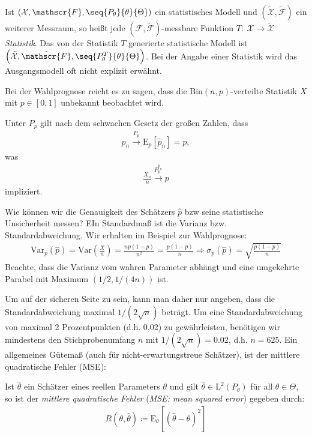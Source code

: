 \documentclass[a4paper]{scrartcl}
\begin{document}
		\begin{definition}
			Ist $(\mathcal{X},\mathscr{F},\seq{P_\theta}{\theta}{\Theta})$ ein statistisches Modell und $(\tilde{\mathcal{X}},\tilde{\mathscr{F}})$ ein weiterer Messraum, so heißt jede $(\mathscr{F},\tilde{\mathscr{F}})$-messbare Funktion $T\colon~\mathcal{X}\to\tilde{\mathcal{X}}$ \emph{Statistik}. Das von der Statistik $T$ generierte statistische Modell ist $\left(\tilde{\mathcal{X}},\tilde{\mathscr{F}},\seq{P_\theta^T}{\theta}{\Theta}\right)$. Bei der Angabe einer Statistik wird das Ausgangsmodell oft nicht explizit erwähnt.
		\end{definition}
		\begin{example}
			Bei der Wahlprognose reicht es zu sagen, dass die Bin$(n,p)$-verteilte Statistik $X$ mit $p\in[0,1]$ unbekannt beobachtet wird.
			
			Unter $P_p$ gilt nach dem schwachen Gesetz der großen Zahlen, dass
			\begin{align*}
				\hat{p}_n\xrightarrow{P_p}\mathrm{E}_p\left[\hat{p}_n\right]=p,
			\end{align*}
			was 
			\begin{align*}
				\frac{X_n}{n}\xrightarrow{P_p^{\hat{p}_n}}p
			\end{align*}
			impliziert.
		\end{example}
		\begin{motivation}
			Wie können wir die Genauigkeit des Schätzers $\hat{p}$ bzw seine statistische Unsicherheit messen? EIn Standardmaß ist die Varianz bzw. Standardabweichung. Wir erhalten im Beispiel zur Wahlprognose:
			\begin{align*}
				\text{Var}_p(\hat{p})=\text{Var}\left(\frac{X}{n}\right)=\frac{np(1-p)}{n^2}=\frac{p(1-p)}{n}\Rightarrow\sigma_p(\hat{p})=\sqrt{\frac{p(1-p)}{n}}
			\end{align*}
			Beachte, dass die Varianz vom wahren Parameter abhängt und eine umgekehrte Parabel mit Maximum $(1/2,1/(4n))$ ist.
			
			Um auf der sicheren Seite zu sein, kann man daher nur angeben, dass die Standardabweichung maximal $1/(2\sqrt{n})$ beträgt. Um eine Standardabweichung von maximal 2 Prozentpunkten (d.h. 0,02) zu gewährleisten, benötigen wir mindestens den Stichprobenumfang $n$ mit $1/(2\sqrt{n})=0.02$, d.h. $n=625$. Ein allgemeines Gütemaß (auch für nicht-erwartungstreue Schätzer), ist der mittlere quadratische Fehler (MSE):
		\end{motivation}
		\begin{definition}
			Ist $\hat{\theta}$ ein Schätzer eines reellen Parameters $\theta$ und gilt $\hat{\theta}\in\mathrm{L}^2\left(P_\theta\right)$ für all $\theta\in\Theta$, so ist der \emph{mittlere quadratische Fehler} (\emph{MSE: mean squared error}) gegeben durch:
			\begin{align*}
				R(\theta,\hat{\theta})\coloneq \mathrm{E}_\theta\left[\left(\hat{\theta}-\theta\right)^2\right]
			\end{align*}
		\end{definition}
\end{document}

